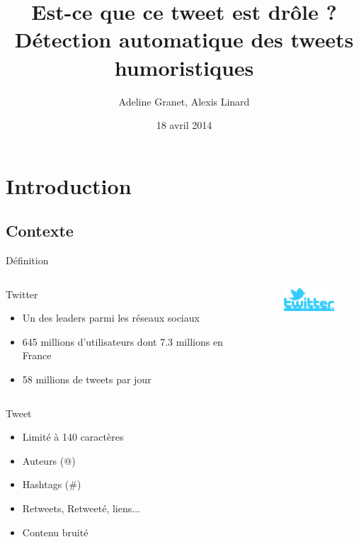 \documentclass{beamer}
\title[Détection automatique des tweets humoristiques]{Est-ce que ce tweet est drôle ? \\ Détection automatique des tweets humoristiques}
\author{Adeline Granet, Alexis Linard}
\institute{Université de Nantes}
\date{18 avril 2014}
\begin{document}
\begin{frame}
  \titlepage
\end{frame}


\section{Introduction}
\subsection{Contexte}
\begin{frame}[allowframebreaks]{Définition}
	\begin{columns}
		\column{9cm}
		\begin{block}{Twitter}
			\begin{itemize}
				\item Un des leaders parmi les réseaux sociaux
				\item 645 millions d'utilisateurs dont 7.3 millions en France
				\item 58 millions de tweets par jour
			\end{itemize}
		\end{block}
		
		\column{2.5cm}
		\begin{figure}
			\includegraphics[width=2cm]{twitter.png}
		\end{figure}
	\end{columns}



\begin{block}{Tweet}
\begin{itemize}
\item Limité à 140 caractères
\item Auteurs (@)
\item Hashtags (\#)
\item Retweets, Retweeté, liens...
\item Contenu bruité
\end{itemize}
\end{block}

\end{frame}
\end{document}
